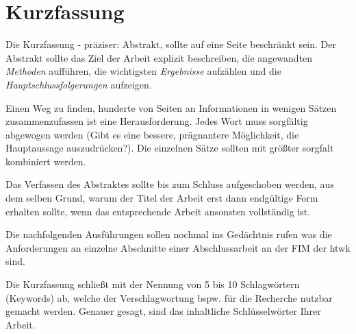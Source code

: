

\clearpage
\chapter*{Kurzfassung}
Die Kurzfassung - präziser: Abstrakt, sollte auf eine Seite beschränkt sein. Der Abstrakt
sollte das Ziel der Arbeit explizit beschreiben, die angewandten \textit{Methoden} aufführen, die
wichtigsten \textit{Ergebnisse} aufzählen und die \textit{Hauptschlussfolgerungen} aufzeigen.

Einen Weg zu finden, hunderte von Seiten an Informationen in wenigen Sätzen zusammenzufassen
ist eine Herausforderung. Jedes Wort muss sorgfältig abgewogen werden
(Gibt es eine bessere, prägnantere Möglichkeit, die Hauptaussage auszudrücken?). Die
einzelnen Sätze sollten mit größter sorgfalt kombiniert werden.

Das Verfassen des Abstraktes sollte bis zum Schluss aufgeschoben werden, aus dem
selben Grund, warum der Titel der Arbeit erst dann endgültige Form erhalten sollte,
wenn das entsprechende Arbeit ansonsten vollständig ist.

Die nachfolgenden Ausführungen sollen nochmal ins Gedächtnis rufen was die Anforderungen an einzelne Abschnitte einer Abschlussarbeit
an der FIM der htwk sind.

Die Kurzfassung schließt mit der Nennung von 5 bis 10 Schlagwörtern (Keywords) ab,
welche der Verschlagwortung bspw. für die Recherche nutzbar gemacht werden. Genauer gesagt, sind das inhaltliche Schlüsselwörter Ihrer Arbeit.\\\\
